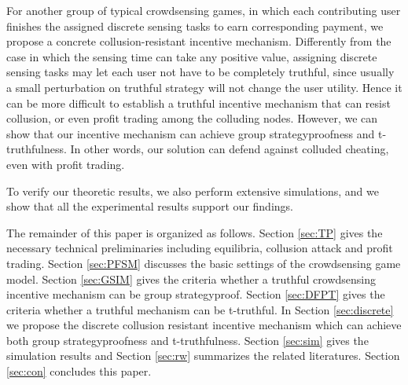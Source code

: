 \documentclass[conference]{IEEEtran}
\theoremstyle{definition}
\begin{document}
\bolditem For another group of typical crowdsensing games, in which each contributing user finishes the assigned discrete sensing tasks to earn corresponding payment, we propose a concrete collusion-resistant incentive mechanism. %
{\color{black}Differently from the case in which the sensing time can take any positive value, assigning discrete sensing tasks may let each user not have to be completely truthful, since usually a small perturbation on truthful strategy will not change the user utility. Hence it can be more difficult to establish a truthful incentive mechanism that can resist collusion, or even profit trading among the colluding nodes. 
However, we can show that our incentive mechanism can achieve group strategyproofness and t-truthfulness. In other words, our solution can defend against colluded cheating, even with profit trading.}


\bolditem To verify our theoretic results, we also perform extensive simulations, and we show that all the experimental results support our findings.

{\color{black}
The remainder of this paper is organized as follows. Section \ref{sec:TP} gives the necessary technical preliminaries including equilibria, collusion attack and profit trading. Section \ref{sec:PFSM} discusses the basic settings of the crowdsensing game model. Section \ref{sec:GSIM} gives the criteria whether a truthful crowdsensing incentive mechanism can be group strategyproof. Section \ref{sec:DFPT} gives the criteria whether a truthful mechanism can be t-truthful. 
In Section \ref{sec:discrete} we propose the discrete collusion resistant incentive mechanism which can achieve both group strategyproofness and t-truthfulness. 
Section \ref{sec:sim} gives the simulation results and Section \ref{sec:rw} summarizes the related literatures. Section \ref{sec:con} concludes this paper.
}
\end{document}
